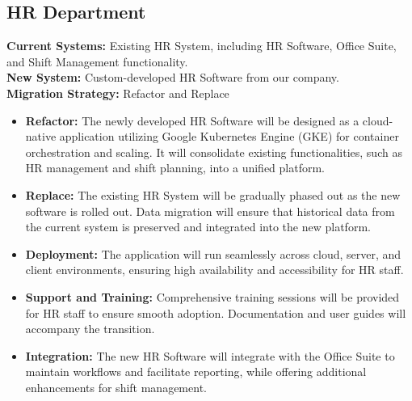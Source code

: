 \subsection{HR Department}
\textbf{Current Systems:} Existing HR System, including HR Software, Office Suite, and Shift Management functionality. \\
\textbf{New System:} Custom-developed HR Software from our company. \\
\textbf{Migration Strategy:} Refactor and Replace
\begin{itemize}
    \item \textbf{Refactor:} The newly developed HR Software will be designed as a cloud-native application utilizing Google Kubernetes Engine (GKE) for container orchestration and scaling. It will consolidate existing functionalities, such as HR management and shift planning, into a unified platform.
    \item \textbf{Replace:} The existing HR System will be gradually phased out as the new software is rolled out. Data migration will ensure that historical data from the current system is preserved and integrated into the new platform.
    \item \textbf{Deployment:} The application will run seamlessly across cloud, server, and client environments, ensuring high availability and accessibility for HR staff.
    \item \textbf{Support and Training:} Comprehensive training sessions will be provided for HR staff to ensure smooth adoption. Documentation and user guides will accompany the transition.
    \item \textbf{Integration:} The new HR Software will integrate with the Office Suite to maintain workflows and facilitate reporting, while offering additional enhancements for shift management.
\end{itemize}


